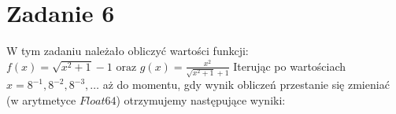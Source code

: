 \documentclass{article}
\begin{document}
\section*{Zadanie 6}
W tym zadaniu należało obliczyć wartości funkcji: $f(x) = \sqrt{x^2 + 1} - 1 \text{ oraz } g(x) = \frac{x^2}{\sqrt{x^2 + 1} + 1}$
Iterując po wartościach $x = 8^{-1}, 8^{-2}, 8^{-3}, \ldots$ aż do momentu, gdy wynik obliczeń przestanie się zmieniać (w arytmetyce $Float64$) otrzymujemy następujące wyniki:
\end{document}
